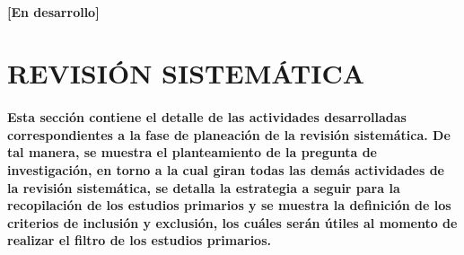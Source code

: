 \documentclass[10pt, twocolumn]{article}
\begin{document}
\paragraph{[En desarrollo]}


\section{REVISIÓN SISTEMÁTICA}
\paragraph{Esta sección contiene el detalle de las actividades desarrolladas correspondientes a la fase de planeación de la revisión sistemática. De tal manera, se muestra el planteamiento de la pregunta de investigación, en torno a la cual giran todas las demás actividades de la revisión sistemática, se detalla la estrategia a seguir para la recopilación de los estudios primarios y se muestra la definición de los criterios de inclusión y exclusión, los cuáles serán útiles al momento de realizar el filtro de los estudios primarios.}
\end{document}
